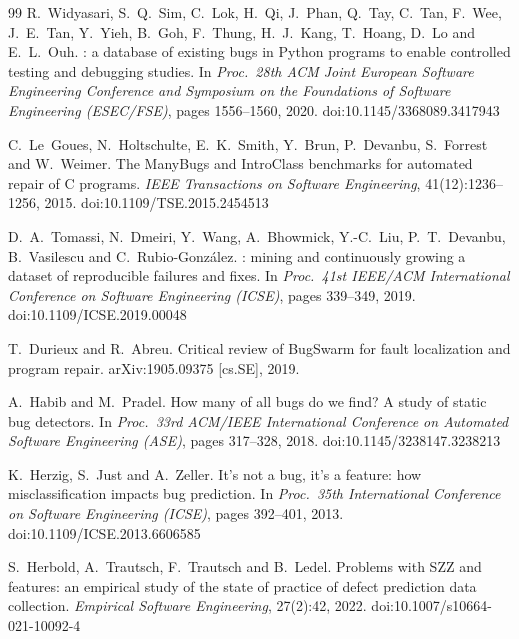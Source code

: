 \documentclass[11pt,a4paper]{article}
\begin{document}
\begin{thebibliography}{99}
R.~Widyasari, S.~Q.~Sim, C.~Lok, H.~Qi, J.~Phan, Q.~Tay, C.~Tan, F.~Wee,
J.~E.~Tan, Y.~Yieh, B.~Goh, F.~Thung, H.~J.~Kang, T.~Hoang, D.~Lo and
E.~L.~Ouh.
: a database of existing bugs in {P}ython programs to
enable controlled testing and debugging studies.
\newblock In \emph{Proc.\ 28th ACM Joint European Software Engineering
Conference and Symposium on the Foundations of Software Engineering
(ESEC/FSE)}, pages 1556--1560, 2020.
\newblock doi:10.1145/3368089.3417943

C.~Le~Goues, N.~Holtschulte, E.~K.~Smith, Y.~Brun, P.~Devanbu, S.~Forrest
and W.~Weimer.
\newblock The {ManyBugs} and {IntroClass} benchmarks for automated repair of
{C} programs.
\newblock \emph{IEEE Transactions on Software Engineering},
41(12):1236--1256, 2015.
\newblock doi:10.1109/TSE.2015.2454513

D.~A.~Tomassi, N.~Dmeiri, Y.~Wang, A.~Bhowmick, Y.-C.~Liu, P.~T.~Devanbu,
B.~Vasilescu and C.~Rubio-Gonz\'alez.
: mining and continuously growing a dataset of
reproducible failures and fixes.
\newblock In \emph{Proc.\ 41st IEEE/ACM International Conference on Software
Engineering (ICSE)}, pages 339--349, 2019.
\newblock doi:10.1109/ICSE.2019.00048

T.~Durieux and R.~Abreu.
\newblock Critical review of {BugSwarm} for fault localization and program
repair.
\newblock arXiv:1905.09375 [cs.SE], 2019.

A.~Habib and M.~Pradel.
\newblock How many of all bugs do we find? {A} study of static bug detectors.
\newblock In \emph{Proc.\ 33rd ACM/IEEE International Conference on Automated
Software Engineering (ASE)}, pages 317--328, 2018.
\newblock doi:10.1145/3238147.3238213

K.~Herzig, S.~Just and A.~Zeller.
\newblock It's not a bug, it's a feature: how misclassification impacts bug
prediction.
\newblock In \emph{Proc.\ 35th International Conference on Software
Engineering (ICSE)}, pages 392--401, 2013.
\newblock doi:10.1109/ICSE.2013.6606585

S.~Herbold, A.~Trautsch, F.~Trautsch and B.~Ledel.
\newblock Problems with {SZZ} and features: an empirical study of the state
of practice of defect prediction data collection.
\newblock \emph{Empirical Software Engineering}, 27(2):42, 2022.
\newblock doi:10.1007/s10664-021-10092-4


\end{thebibliography}
\end{document}
